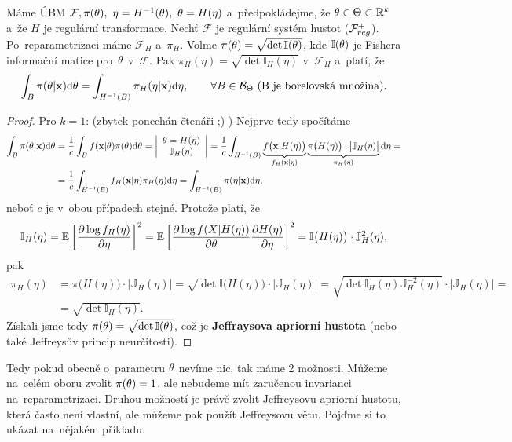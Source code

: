 \begin{theorem}[Jeffreys]
	Máme ÚBM $\mathcal{F},\pi(\theta),~\eta=H^{-1}(\theta),~\theta=H(\eta)$ a~předpokládejme, že $\theta\in\Theta\subset\mathbb{R}^k$ a~že $H$ je regulární transformace. Nechť $\mathcal{F}$ je regulární systém hustot ($\mathcal{F}_{reg}^+$). Po~reparametrizaci máme $\mathcal{F}_H$ a~$\pi_H$. Volme $\pi(\theta)=\sqrt{\det \mathbb{I}(\theta)}$, kde $\mathbb{I}(\theta)$ je Fishera informační matice pro~$\theta$ v~$\mathcal{F}$. Pak $\pi_H(\eta)=\sqrt{\det \mathbb{I}_H(\eta)}$ v~$\mathcal{F}_H$ a~platí, že 
	$$ \int_B\pi(\theta|\textbf{x})\mathrm{d}\theta=\int_{H^{-1}(B)}\pi_H(\eta|\textbf{x})\mathrm{d}\eta,\qquad\forall B\in\mathcal{B}_\Theta \text{ (B je borelovská množina).}$$
	\begin{proof}
		Pro $k=1$: (zbytek ponechán čtenáři ;) ) Nejprve tedy spočítáme
		\[
		\begin{split}
		\int_B\pi(\theta|\textbf{x})\mathrm{d}\theta&=\frac{1}{c}\int_B f(\textbf{x}|\theta)\pi(\theta)\mathrm{d}\theta=\left|\begin{array}{c}
		\theta=H(\eta)\\\mathbb{J}_H(\eta)
		\end{array}
		\right|=\frac{1}{c}\int_{H^{-1}(B)}\underbrace{f\big(\textbf{x}|H(\eta)\big)}_{f_H(\textbf{x}|\eta)}\underbrace{\pi\big(H(\eta)\big)\cdot\big|\mathbb{J}_H(\eta)\big|}_{\pi_H(\eta)}\mathrm{d}\eta=\\&=\frac{1}{c}\int_{H^{-1}(B)}f_H(\textbf{x}|\eta)\pi_H(\eta)\mathrm{d}\eta=\int_{H^{-1}(B)}\pi(\eta|\textbf{x})\mathrm{d}\eta,
		\end{split}
		\]
		neboť $c$ je v~obou případech stejné. Protože platí, že
		$$ \mathbb{I}_H(\eta)=\mathbb{E}\left[ \frac{\partial\log f_H(\eta)}{\partial\eta} \right]^2=\mathbb{E}\left[ \frac{\partial\log f(X|H(\eta))}{\partial\theta}\frac{\partial H(\eta)}{\partial\eta} \right]^2=\mathbb{I}\big(H(\eta)\big) \cdot \mathbb{J}_H^2(\eta) ,$$
		pak \[
		\begin{split}
		\pi_H(\eta)&=\pi\big(H(\eta)\big)\cdot\big|\mathbb{J}_H(\eta)\big|=\sqrt{\det \mathbb{I}\big(H(\eta)\big)}\cdot\big|\mathbb{J}_H(\eta)\big|=\sqrt{\det \mathbb{I}_H(\eta)\mathbb{J}_H^{-2}(\eta)}\cdot\big|\mathbb{J}_H(\eta)\big|=\\&=\sqrt{\det \mathbb{I}_H(\eta)}.
		\end{split}
		\]
		Získali jsme tedy $\pi(\theta)=\sqrt{\det \mathbb{I}(\theta)}$, což je \textbf{Jeffraysova apriorní hustota} (nebo také Jeffreysův princip neurčitosti).
	\end{proof}
\end{theorem}
Tedy pokud obecně o~parametru $\theta$ nevíme nic, tak máme 2 možnosti. Můžeme na~celém oboru zvolit $\pi(\theta)=1$, ale nebudeme mít zaručenou invarianci na~reparametrizaci. Druhou možností je právě zvolit Jeffreysovu apriorní hustotu, která často není vlastní, ale můžeme pak použít Jeffreysovu větu. Pojďme si to ukázat na~nějakém příkladu.
